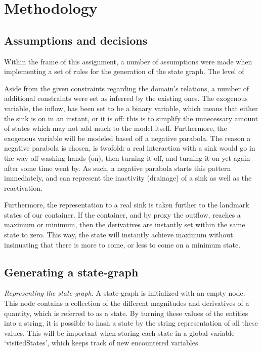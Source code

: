 \section{Methodology}

\subsection{Assumptions and decisions}
Within the frame of this assignment, a number of assumptions were made when
implementing a set of rules for the generation of the state graph. The level of

Aside from the given constraints regarding the domain's relations, a number of
additional constraints were set as inferred by the existing ones. The exogenous
variable, the inflow, has been set to be a binary variable, which means that
either the sink is on in an instant, or it is off: this is to simplify the
unnecessary amount of states which may not add much to the model itself.
Furthermore, the exogenous variable will be modeled based off a negative
parabola. The reason a negative parabola is chosen, is twofold: a real
interaction with a sink would go in the way off washing hands (on), then turning
it off, and turning it on yet again after some time went by. As such, a negative
parabola starts this pattern immediately, and can represent the inactivity (drainage)
of a sink as well as the reactivation.

Furthermore, the representation to a real sink is taken further to the landmark
states of our container. If the container, and by proxy the outflow, reaches a
maximum or minimum, then the derivatives are instantly set within the same state
to zero. This way, the state will instantly achieve maximum without insinuating
that there is more to come, or less to come on a minimum state.

\subsection{Generating a state-graph}
\textit{Representing the state-graph}. A state-graph is initialized with an empty node. This node contains a collection
of the different magnitudes and derivatives of a quantity, which is referred to
as a state. By turning these values of the entities into a string, it is
possible to hash a state by the string representation of all these values. This
will be important when storing each state in a global variable `visitedStates',
which keeps track of new encountered variables. 

